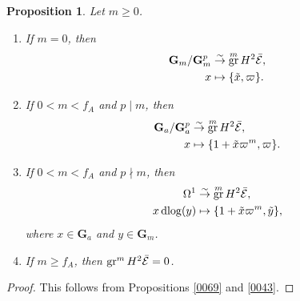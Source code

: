 \documentclass{amsart}
\newtheorem{Prop}[Thm]{Proposition}
\theoremstyle{remark}
\numberwithin{equation}{subsection}
\newcommand{\isomto}{\overset{\sim}{\to}}
\newcommand{\Gm}{\mathbf{G}_{m}}
\newcommand{\Ga}{\mathbf{G}_{a}}
\DeclareMathOperator{\gr}{gr}
\DeclareMathOperator{\dlog}{dlog}
\begin{document}
\begin{Prop} \label{0229}
	Let $m \ge 0$.
	\begin{enumerate}
		\item \label{0230}
			If $m = 0$, then
				\begin{align*}
							\Gm / \Gm^{p}
					&	\isomto
							\gr^{m} H^{2} \Bar{\mathcal{E}},
					\\
							x
					&	\mapsto
							\{\Tilde{x}, \varpi\}.
				\end{align*}
		\item \label{0231}
			If $0 < m < f_{A}$ and $p \mid m$, then
				\begin{align*}
							\Ga / \Ga^{p}
					&	\isomto
							\gr^{m} H^{2} \Bar{\mathcal{E}},
					\\
							x
					&	\mapsto
							\{1 + \Tilde{x} \varpi^{m}, \varpi\}.
				\end{align*}
		\item \label{0232}
			If $0 < m < f_{A}$ and $p \nmid m$, then
				\begin{align*}
							\Omega^{1}
					&	\isomto
							\gr^{m} H^{2} \Bar{\mathcal{E}},
					\\
							x \dlog(y)
					&	\mapsto
							\{1 + \Tilde{x} \varpi^{m}, \Tilde{y}\},
				\end{align*}
			where $x \in \Ga$ and $y \in \Gm$.
		\item \label{0233}
			If $m \ge f_{A}$, then $\gr^{m} H^{2} \Bar{\mathcal{E}} = 0$.
	\end{enumerate}
\end{Prop}

\begin{proof}
	This follows from
	Propositions \ref{0069} and \ref{0043}.
\end{proof}
\end{document}

